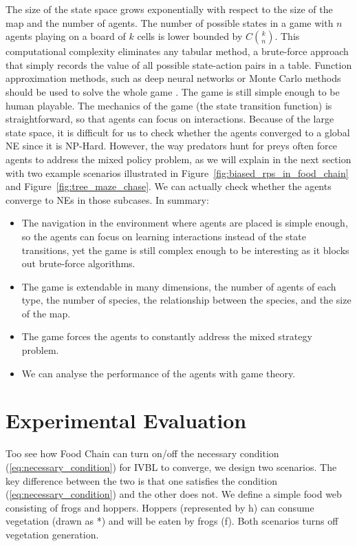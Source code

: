 \documentclass[]{interact}
\theoremstyle{plain}%
\theoremstyle{definition}
\theoremstyle{remark}
\begin{document}
The size of the state space grows exponentially with respect to the size of the map and the number of agents. The number of possible states in a game with $n$ agents playing on a board of $k$ cells is lower bounded by $C{k \choose n}$. This computational complexity eliminates any tabular method, a brute-force approach that simply records the value of all possible state-action pairs in a table. Function approximation methods, such as deep neural networks or Monte Carlo methods should be used to solve the whole game \cite{silver2016mastering}. The game is still simple enough to be human playable. The mechanics of the game (the state transition function) is straightforward, so that agents can focus on interactions. Because of the large state space, it is difficult for us to check whether the agents converged to a global NE since it is NP-Hard. However, the way predators hunt for preys often force agents to address the mixed policy problem, as we will explain in the next section with two example scenarios illustrated in Figure~\ref{fig:biased_rps_in_food_chain} and Figure~\ref{fig:tree_maze_chase}. We can actually check whether the agents converge to NEs in those subcases. In summary:
\begin{itemize}
    \item The navigation in the environment where agents are placed is simple enough, so the agents can focus on learning interactions instead of the state transitions, yet the game is still complex enough to be interesting as it blocks out brute-force algorithms.
    \item The game is extendable in many dimensions, the number of agents of each type, the number of species, the relationship between the species, and the size of the map.
    \item The game forces the agents to constantly address the mixed strategy problem.
    \item We can analyse the performance of the agents with game theory.
\end{itemize}

\section{Experimental Evaluation}
Too see how Food Chain can turn on/off the necessary condition (\ref{eq:necessary_condition}) for IVBL to converge, we design two scenarios. The key difference between the two is that one satisfies the condition (\ref{eq:necessary_condition}) and the other does not. We define a simple food web consisting of frogs and hoppers. Hoppers (represented by h) can consume vegetation (drawn as *) and will be eaten by frogs (f). Both scenarios turns off vegetation generation.
\end{document}
